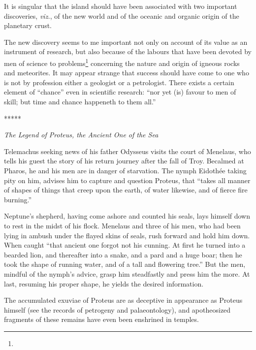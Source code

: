 \documentclass[a4paper, 12pt, oneside]{article}
\begin{document}
It is singular that the island should have been associated with two important discoveries, \emph{viz.}, of the new world and of the oceanic and organic origin of the planetary crust.

The new discovery seems to me important not only on account of its value as an instrument of research, but also because of the labours that have been devoted by men of science to problems\footnote{} concerning the nature and origin of igneous rocks and meteorites. It may appear strange that success should have come to one who is not by profession either a geologist or a petrologist. There exists a certain element of ``chance'' even in scientific research: ``nor yet (is) favour to men of skill; but time and chance happeneth to them all.''

\centerline{*\hspace{15mm}*\hspace{15mm}*\hspace{15mm}*\hspace{15mm}*}
\bigskip

\centerline{\emph{The Legend of Proteus, the Ancient One of the Sea}}

Telemachus seeking news of his father Odysseus visits the court of Menelaus, who tells his guest the story of his return journey after the fall of Troy. Becalmed at Pharos, he and his men are in danger of starvation. The nymph Eidothée taking pity on him, advises him to capture and question Proteus, that ``takes all manner of shapes of things that creep upon the earth, of water likewise, and of fierce fire burning.''

Neptune's shepherd, having come ashore and counted his seals, lays himself down to rest in the midst of his flock. Menelaus and three of his men, who had been lying in ambush under the flayed skins of seals, rush forward and hold him down. When caught ``that ancient one forgot not his cunning. At first he turned into a bearded lion, and thereafter into a snake, and a pard and a huge boar; then he took the shape of running water, and of a tall and flowering tree.'' But the men, mindful of the nymph's advice, grasp him steadfastly and press him the more. At last, resuming his proper shape, he yields the desired information.

The accumulated exuviae of Proteus are as deceptive in appearance as Proteus himself (see the records of petrogeny and palaeontology), and apotheosized fragments of these remains have even been enshrined in temples.
\end{document}
